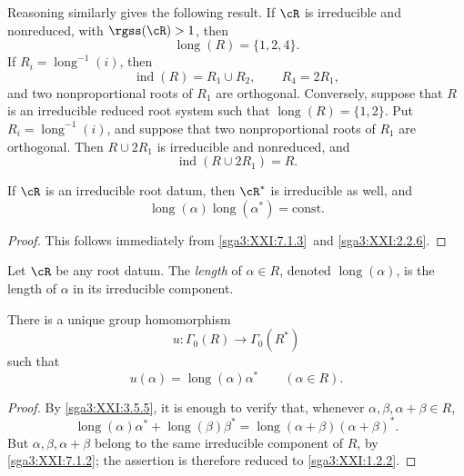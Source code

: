 \begin{remark}\label{sga3:XXI:7.2.4}
Reasoning similarly gives the following result.  If \(\cR\) is
irreducible and nonreduced, with \(\rgss(\cR)>1\), then
\[
 \operatorname{long}(R)=\{1,2,4\}.
\]
If \(R_i=\operatorname{long}^{-1}(i)\), then
\[
 \operatorname{ind}(R)=R_1\cup R_2,\qquad R_4=2R_1,
\]
and two nonproportional roots of \(R_1\) are orthogonal.
Conversely, suppose that \(R\) is an irreducible reduced root
system such that \(\operatorname{long}(R)=\{1,2\}\).  Put
\(R_i=\operatorname{long}^{-1}(i)\), and suppose that two
nonproportional roots of \(R_1\) are orthogonal.  Then
\(R\cup2R_1\) is irreducible and nonreduced, and
\[
 \operatorname{ind}(R\cup2R_1)=R.
\]
\end{remark}

\begin{lemma}\label{sga3:XXI:7.2.5}
If \(\cR\) is an irreducible root datum, then \(\cR^\ast\) is
irreducible as well, and
\[
 \operatorname{long}(\alpha)\operatorname{long}(\alpha^\ast)=\mathrm{const}.
\]
\end{lemma}

\begin{proof}
This follows immediately from \ref{sga3:XXI:7.1.3}\, and
\ref{sga3:XXI:2.2.6}.
\end{proof}

\begin{definition}\label{sga3:XXI:7.2.6}
Let \(\cR\) be any root datum.  The \emph{length} of
\(\alpha\in R\), denoted \(\operatorname{long}(\alpha)\), is the
length of \(\alpha\) in its irreducible component.
\end{definition}

\begin{lemma}\label{sga3:XXI:7.2.7}
There is a unique group homomorphism
\[
 u:\Gamma_0(R)\longrightarrow\Gamma_0(R^\ast)
\]
such that
\[
 u(\alpha)=\operatorname{long}(\alpha)\alpha^\ast
 \qquad(\alpha\in R).
\]
\end{lemma}

\begin{proof}
By \ref{sga3:XXI:3.5.5}, it is enough to verify that, whenever
\(\alpha,\beta,\alpha+\beta\in R\),
\[
 \operatorname{long}(\alpha)\alpha^\ast+
 \operatorname{long}(\beta)\beta^\ast
 =
 \operatorname{long}(\alpha+\beta)(\alpha+\beta)^\ast.
\]
But \(\alpha,\beta,\alpha+\beta\) belong to the same irreducible
component of \(R\), by \ref{sga3:XXI:7.1.2}; the assertion is
therefore reduced to \ref{sga3:XXI:1.2.2}.
\end{proof}

